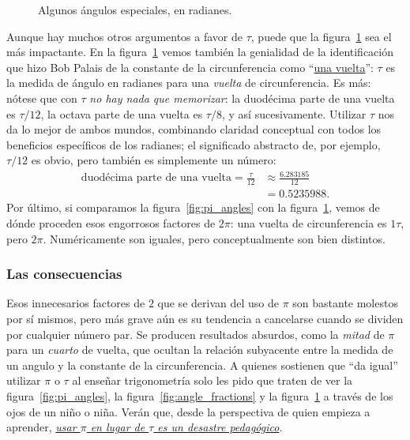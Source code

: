 \begin{figure}
\begin{center}
\end{center}
\caption{Algunos ángulos especiales, en radianes.\label{fig:tau_angles}}
\end{figure}

Aunque hay muchos otros argumentos a favor de $\tau$, puede que la figura~\ref{fig:tau_angles} sea el más impactante. En la figura~\ref{fig:tau_angles} vemos también la genialidad de la identificación que hizo Bob Palais de la constante de la circunferencia como ``\href{https://es.wikipedia.org/wiki/Vuelta_(%C3%A1ngulo)}{una vuelta}'': $\tau$ es la medida de ángulo en radianes para una \emph{vuelta} de circunferencia. Es más: nótese que con $\tau$ \emph{no hay nada que memorizar}: la duodécima parte de una vuelta es $\tau/12$, la octava parte de una vuelta es $\tau/8$, y así sucesivamente. Utilizar $\tau$ nos da lo mejor de ambos mundos, combinando claridad conceptual con todos los beneficios específicos de los radianes; el significado abstracto de, por ejemplo, $\tau/12$ es obvio, pero también es simplemente un número:
\[
\begin{split}
\mbox{duodécima parte de una vuelta} = \frac{\tau}{12} & \approx \frac{6.283185}{12} \\
                                                       & = 0.5235988.
\end{split}
\]
Por último, si comparamos la figura~\ref{fig:pi_angles} con la figura~\ref{fig:tau_angles}, vemos de dónde proceden esos engorrosos factores de $2\pi$: una vuelta de circunferencia es $1\tau$, pero $2\pi$. Numéricamente son iguales, pero conceptualmente son bien distintos.

    \subsubsection{Las consecuencias} %
    \label{sec:the_ramifications}

Esos innecesarios factores de $2$ que se derivan del uso de $\pi$ son bastante molestos por sí mismos, pero más grave aún es su tendencia a cancelarse cuando se dividen por cualquier número par. Se producen resultados absurdos, como la  \emph{mitad} de $\pi$ para un \emph{cuarto} de vuelta, que ocultan la relación subyacente entre la medida de un angulo y la constante de la circunferencia. A quienes sostienen que ``da igual'' utilizar $\pi$ o $\tau$ al enseñar trigonometría solo les pido que traten de ver la figura~\ref{fig:pi_angles}, la figura~\ref{fig:angle_fractions} y la figura~\ref{fig:tau_angles} a través de los ojos de un niño o niña. Verán que, desde la perspectiva de quien empieza a aprender, \href{http://tauday.com/a-tau-testimonial}{\emph{usar $\pi$ en lugar de $\tau$ es un desastre pedagógico}}.

